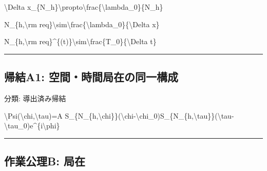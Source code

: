 \documentclass[
  a4paper]{ltjsarticle}
\newenvironment{Shaded}{}{}
\newcommand{\NormalTok}[1]{#1}
\begin{document}
\begin{Shaded}
\begin{Highlighting}[]
\NormalTok{\textbackslash{}Delta x\_\{N\_h\}\textbackslash{}propto\textbackslash{}frac\{\textbackslash{}lambda\_0\}\{N\_h\}}
\end{Highlighting}
\end{Shaded}

\begin{Shaded}
\begin{Highlighting}[]
\NormalTok{N\_\{h,\textbackslash{}rm req\}\textbackslash{}sim\textbackslash{}frac\{\textbackslash{}lambda\_0\}\{\textbackslash{}Delta x\}}
\end{Highlighting}
\end{Shaded}

\begin{Shaded}
\begin{Highlighting}[]
\NormalTok{N\_\{h,\textbackslash{}rm req\}\^{}\{(t)\}\textbackslash{}sim\textbackslash{}frac\{T\_0\}\{\textbackslash{}Delta t\}}
\end{Highlighting}
\end{Shaded}

\begin{center}\rule{0.5\linewidth}{0.5pt}\end{center}

\subsection{帰結A1:
空間・時間局在の同一構成}\label{ux5e30ux7d50a1-ux7a7aux9593ux6642ux9593ux5c40ux5728ux306eux540cux4e00ux69cbux6210}

分類: 導出済み帰結

\begin{Shaded}
\begin{Highlighting}[]
\NormalTok{\textbackslash{}Psi(\textbackslash{}chi,\textbackslash{}tau)=A S\_\{N\_\{h,\textbackslash{}chi\}\}(\textbackslash{}chi{-}\textbackslash{}chi\_0)S\_\{N\_\{h,\textbackslash{}tau\}\}(\textbackslash{}tau{-}\textbackslash{}tau\_0)e\^{}\{i\textbackslash{}phi\}}
\end{Highlighting}
\end{Shaded}

\begin{center}\rule{0.5\linewidth}{0.5pt}\end{center}

\subsection{作業公理B:
局在}\label{ux4f5cux696dux516cux7406b-ux5c40ux5728}
\end{document}
